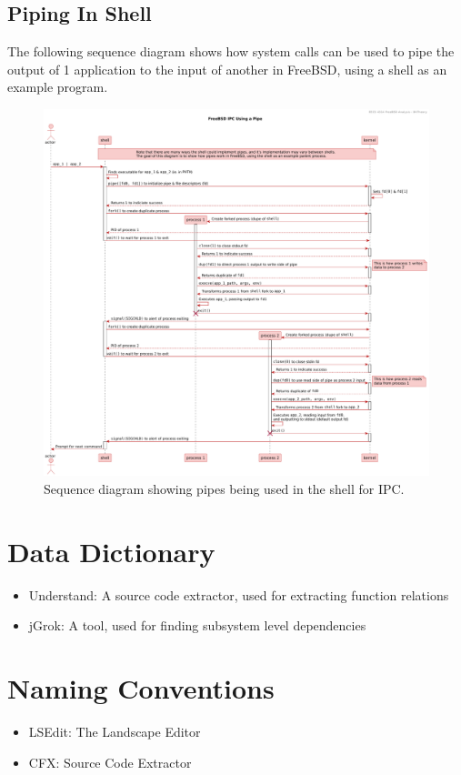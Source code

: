 \documentclass[12pt, dvipsnames, a4paper]{article}
\begin{document}
\subsection{Piping In Shell}
The following sequence diagram shows how system calls can be used to pipe the
output of 1 application to the input of another in FreeBSD, using a shell
as an example program.
\begin{figure}[!htb]
	\advance\leftskip-0.5cm
	\includegraphics[width = 570pt]{assets/use_case_diagrams/pipe.pdf}
	\caption{Sequence diagram showing pipes being used in the shell for IPC. \cite{pipe}\cite{fork}\cite{wait}\cite{close}\cite{dup}\cite{execve}\cite{signal}\cite{pipe-explained}}
\end{figure}

\section{Data Dictionary}
\begin{itemize}
	\item{Understand: A source code extractor, used for extracting function relations}
	\item {jGrok: A tool, used for finding subsystem level dependencies}
\end{itemize}

\section{Naming Conventions}
\begin{itemize}
	\item{LSEdit: The Landscape Editor}
	\item {CFX: Source Code Extractor}
\end{itemize}
\end{document}
